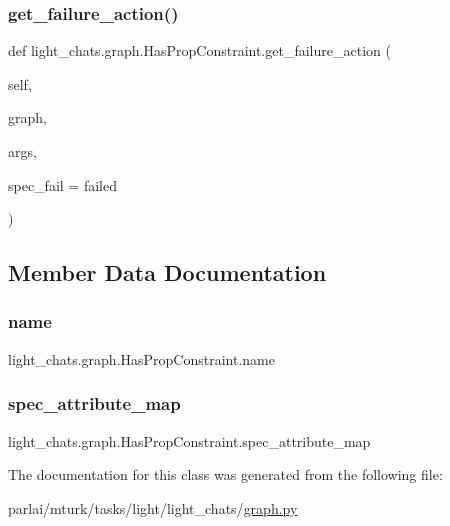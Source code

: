 \subsubsection{\texorpdfstring{get\+\_\+failure\+\_\+action()}{get\_failure\_action()}}
{\footnotesize\ttfamily def light\+\_\+chats.\+graph.\+Has\+Prop\+Constraint.\+get\+\_\+failure\+\_\+action (\begin{DoxyParamCaption}\item[{}]{self,  }\item[{}]{graph,  }\item[{}]{args,  }\item[{}]{spec\+\_\+fail = {\ttfamily \textquotesingle{}failed\textquotesingle{}} }\end{DoxyParamCaption})}



\subsection{Member Data Documentation}
\mbox{\label{classlight__chats_1_1graph_1_1HasPropConstraint_a82dbfb2fb15ed5d9e475a1abeccc2e70}} 
\subsubsection{\texorpdfstring{name}{name}}
{\footnotesize\ttfamily light\+\_\+chats.\+graph.\+Has\+Prop\+Constraint.\+name\hspace{0.3cm}{\ttfamily [static]}}

\mbox{\label{classlight__chats_1_1graph_1_1HasPropConstraint_a7157789f0a8c670ce06d73e7022c35a6}} 
\subsubsection{\texorpdfstring{spec\+\_\+attribute\+\_\+map}{spec\_attribute\_map}}
{\footnotesize\ttfamily light\+\_\+chats.\+graph.\+Has\+Prop\+Constraint.\+spec\+\_\+attribute\+\_\+map\hspace{0.3cm}{\ttfamily [static]}}



The documentation for this class was generated from the following file\+:\begin{DoxyCompactItemize}
\item 
parlai/mturk/tasks/light/light\+\_\+chats/\hyperlink{parlai_2mturk_2tasks_2light_2light__chats_2graph_8py}{graph.\+py}\end{DoxyCompactItemize}
